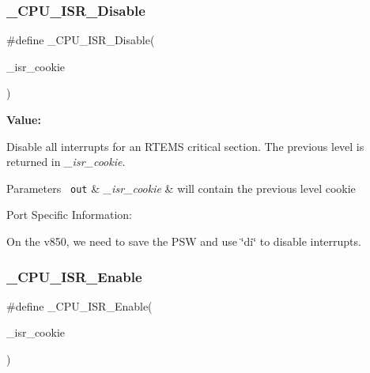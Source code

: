 \subsubsection{\texorpdfstring{\_CPU\_ISR\_Disable}{\_CPU\_ISR\_Disable}}
{\footnotesize\ttfamily \#define \+\_\+\+C\+P\+U\+\_\+\+I\+S\+R\+\_\+\+Disable(\begin{DoxyParamCaption}\item[{}]{\+\_\+isr\+\_\+cookie }\end{DoxyParamCaption})}

{\bfseries Value\+:}
\begin{DoxyCode}{0}
\DoxyCodeLine{\textcolor{keywordflow}{do} \{ \(\backslash\)}
\DoxyCodeLine{    \(\backslash\)}

\end{DoxyCode}
Disable all interrupts for an R\+T\+E\+MS critical section. The previous level is returned in {\itshape \+\_\+isr\+\_\+cookie}.


\begin{DoxyParams}[1]{Parameters}
\mbox{\texttt{ out}}  & {\em \+\_\+isr\+\_\+cookie} & will contain the previous level cookie\\
\hline
\end{DoxyParams}
Port Specific Information\+:

On the v850, we need to save the P\+SW and use \char`\"{}di\char`\"{} to disable interrupts. \mbox{\label{group__RTEMSScoreCPUV850CPUInterrupt_gae3b1e2cd1ea4020d229e759569459664}} 
\subsubsection{\texorpdfstring{\_CPU\_ISR\_Enable}{\_CPU\_ISR\_Enable}}
{\footnotesize\ttfamily \#define \+\_\+\+C\+P\+U\+\_\+\+I\+S\+R\+\_\+\+Enable(\begin{DoxyParamCaption}\item[{}]{\+\_\+isr\+\_\+cookie }\end{DoxyParamCaption})}

